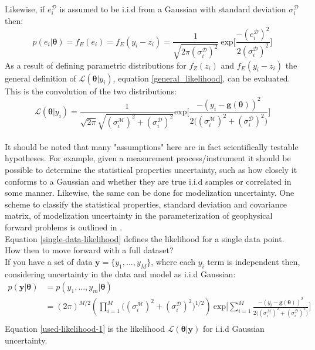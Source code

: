 \begin{tcolorbox}
Likewise, if $e^{\mathcal{D}}_i$ is assumed to be i.i.d from a Gaussian with standard deviation $\sigma^{\mathcal{D}}_i$ then:
\begin{equation}
p(e_i|\bm{\theta}) = f_E(e_i) = f_E(y_i-z_i) = \frac{1}{\sqrt{2\pi(\sigma^{\mathcal{D}}_i)^2}}\ \text{exp}\bigg[\frac{-(e^{\mathcal{D}}_i)^2}{2(\sigma^{\mathcal{D}}_i)^2} \bigg]
\end{equation}
As a result of defining parametric distributions for $f_Z(z_i)$ and $f_E(y_i-z_i)$ the general definition of $\mathcal{L}(\bm{\theta}|y_i)$, equation \ref{general_likelihood}, can be evaluated. This is the convolution of the two distributions: 
\begin{equation}
\mathcal{L}(\bm{\theta}|y_i) = \frac{1}{\sqrt{2\pi}\sqrt{(\sigma^{\mathcal{M}}_i)^2+(\sigma^{\mathcal{D}}_i)^2}} \text{exp}\bigg[\frac{-(y_i-\bm{g}(\bm{\theta}))^2}{2\big((\sigma^{\mathcal{M}}_i)^2+(\sigma^{\mathcal{D}}_i)^2\big)}\bigg]
\label{single-data-likelihood}
\end{equation}\\

It should be noted that many "assumptions" here are in fact scientifically testable hypotheses. For example, given a measurement process/instrument it should be possible to determine the statistical properties uncertainty, such as how closely it conforms to a Gaussian and whether they are true i.i.d samples or correlated in some manner. Likewise, the same can be done for modelization uncertainty. One scheme to classify the statistical properties, standard deviation and covariance matrix, of modelization uncertainty in the parameterization of geophysical forward problems is outlined in \citet{afonso2013b}.\\

Equation \ref{single-data-likelihood} defines the likelihood for a single data point. How then to move forward with a full dataset?\\

If you have a set of data $\bm{y} = \{y_1,...,y_M\}$, where each $y_i$ term is independent then, considering uncertainty in the data and model as i.i.d Gaussian:
\begin{equation}
\begin{split}
p(\bm{y}|\bm{\theta}) &= p(y_1,...,y_m|\bm{\theta})\\
&= (2\pi)^{M/2}(\prod_{i = 1}^{M}\big((\sigma^{\mathcal{M}}_i)^2+(\sigma^{\mathcal{D}}_i)^2\big)^{1/2})\ \text{exp}\bigg[\sum_{i = 1}^{M}\frac{-(y_i-\bm{g}({\bm{\theta}}))^2}{2\big((\sigma^{\mathcal{M}}_i)^2+(\sigma^{\mathcal{D}}_i)^2\big)}\bigg]\\
\label{used-likelihood-1}
\end{split}
\end{equation}
Equation \ref{used-likelihood-1} is the likelihood $\mathcal{L}(\bm{\theta}|\bm{y})$ for i.i.d Gaussian uncertainty.\\ 


\end{tcolorbox}
